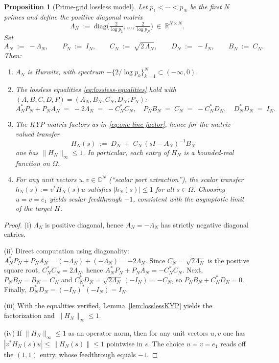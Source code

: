 \documentclass[11pt]{article}
\newtheorem{proposition}[theorem]{Proposition}
\theoremstyle{definition}
\theoremstyle{remark}
\newcommand{\C}{\mathbb{C}}
\newcommand{\R}{\mathbb{R}}
\begin{document}
\begin{proposition}[Prime-grid lossless model]\label{prop:prime-grid-KYP}
Let \(p_1<\cdots<p_N\) be the first \(N\) primes and define the positive diagonal matrix
\[
 \Lambda_N\;:=\;\mathrm{diag}\!\Big(\tfrac{2}{\log p_1},\dots,\tfrac{2}{\log p_N}\Big)\ \in\ \R^{N\times N}.
\]
Set
\[
 A_N\;:=\;-\Lambda_N,\qquad P_N\;:=\;I_N,\qquad C_N\;:=\;\sqrt{2\,\Lambda_N},\qquad D_N\;:=\;-I_N,\qquad B_N\;:=\;C_N.
\]
Then:
\begin{enumerate}
 \item \(A_N\) is Hurwitz, with spectrum \(-\{2/\log p_k\}_{k=1}^N\subset(-\infty,0)\).
 \item The lossless equalities \eqref{eq:lossless-equalities} hold with \((A,B,C,D,P)=(A_N,B_N,C_N,D_N,P_N)\):
 \[
  A_N^*P_N+P_NA_N\;=\;-2\Lambda_N\;=\;-C_N^*C_N,\quad P_NB_N\;=\;C_N\;=\;-C_N^*D_N,\quad D_N^*D_N\;=\;I_N.
 \]
 \item The KYP matrix factors as in \eqref{eq:one-line-factor}, hence for the matrix-valued transfer
 \[
  H_N(s)\;:=\;D_N\; +\; C_N\,(sI-A_N)^{-1} B_N
 \]
one has \(\|H_N\|_\infty\le 1\). In particular, each entry of \(H_N\) is a bounded-real function on \(\Omega\).
 \item For any unit vectors \(u,v\in\C^N\) (``scalar port extraction''), the scalar transfer \(h_N(s):=v^*H_N(s)u\) satisfies \(|h_N(s)|\le 1\) for all \(s\in\Omega\). Choosing \(u=v=e_1\) yields scalar feedthrough \(-1\), consistent with the asymptotic limit of the target \(H\).
\end{enumerate}
\end{proposition}
\begin{proof}
(i) \(\Lambda_N\) is positive diagonal, hence \(A_N=-\Lambda_N\) has strictly negative diagonal entries.

(ii) Direct computation using diagonality: \(A_N^*P_N+P_NA_N=(-\Lambda_N)+(-\Lambda_N)=-2\Lambda_N\). Since \(C_N=\sqrt{2\Lambda_N}\) is the positive square root, \(C_N^*C_N=2\Lambda_N\), hence \(A_N^*P_N+P_NA_N=-C_N^*C_N\). Next, \(P_NB_N=B_N=C_N\) and \(C_N^*D_N=\sqrt{2\Lambda_N}\,(-I_N)=-C_N\), so \(P_NB_N+ C_N^*D_N=0\). Finally, \(D_N^*D_N=(-I_N)^*(-I_N)=I_N\).

(iii) With the equalities verified, Lemma~\ref{lem:losslessKYP} yields the factorization and \(\|H_N\|_\infty\le 1\).

(iv) If \(\|H_N\|_\infty\le 1\) as an operator norm, then for any unit vectors \(u,v\) one has \(|v^*H_N(s)u|\le \|H_N(s)\|\le 1\) pointwise in \(s\). The choice \(u=v=e_1\) reads off the \((1,1)\) entry, whose feedthrough equals \(-1\).
\end{proof}
\end{document}
